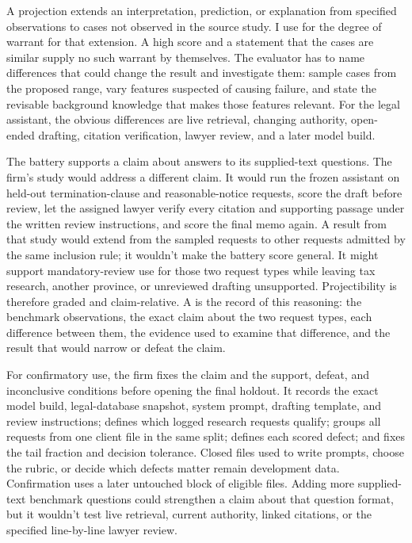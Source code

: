 \documentclass[12pt]{article}
\begin{document}
A projection extends an interpretation, prediction, or explanation from specified observations to cases not observed in the source study. I use  for the degree of warrant for that extension. A high score and a statement that the cases are similar supply no such warrant by themselves. The evaluator has to name differences that could change the result and investigate them: sample cases from the proposed range, vary features suspected of causing failure, and state the revisable background knowledge that makes those features relevant. For the legal assistant, the obvious differences are live retrieval, changing authority, open-ended drafting, citation verification, lawyer review, and a later model build.

The battery supports a claim about answers to its supplied-text questions. The firm's study would address a different claim. It would run the frozen assistant on held-out termination-clause and reasonable-notice requests, score the draft before review, let the assigned lawyer verify every citation and supporting passage under the written review instructions, and score the final memo again. A result from that study would extend from the sampled requests to other requests admitted by the same inclusion rule; it wouldn't make the battery score general. It might support mandatory-review use for those two request types while leaving tax research, another province, or unreviewed drafting unsupported. Projectibility is therefore graded and claim-relative. A  is the record of this reasoning: the benchmark observations, the exact claim about the two request types, each difference between them, the evidence used to examine that difference, and the result that would narrow or defeat the claim.

For confirmatory use, the firm fixes the claim and the support, defeat, and inconclusive conditions before opening the final holdout. It records the exact model build, legal-database snapshot, system prompt, drafting template, and review instructions; defines which logged research requests qualify; groups all requests from one client file in the same split; defines each scored defect; and fixes the tail fraction and decision tolerance. Closed files used to write prompts, choose the rubric, or decide which defects matter remain development data. Confirmation uses a later untouched block of eligible files. Adding more supplied-text benchmark questions could strengthen a claim about that question format, but it wouldn't test live retrieval, current authority, linked citations, or the specified line-by-line lawyer review.
\end{document}
